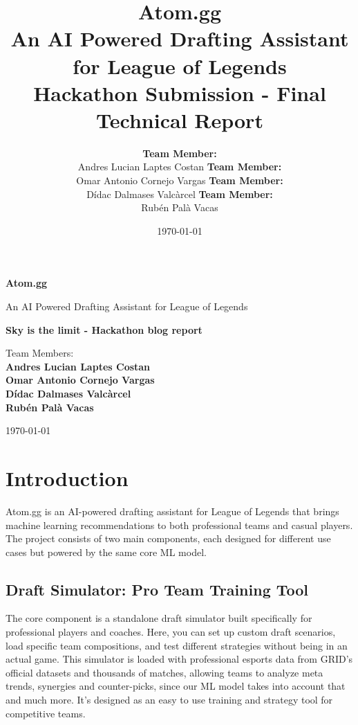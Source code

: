 \documentclass[12pt, a4paper]{article}
\title{
    \vspace{1cm}
    \textbf{\Huge Atom.gg} \\
    \vspace{0.5cm}
    \Large An AI Powered Drafting Assistant for League of Legends \\
    \vspace{1cm}
    \large Hackathon Submission - Final Technical Report
}
\author{
    \textbf{Team Member:} \\
    Andres Lucian Laptes Costan
    \textbf{Team Member:} \\
    Omar Antonio Cornejo Vargas
    \textbf{Team Member:} \\
    Dídac Dalmases Valcàrcel
    \textbf{Team Member:} \\
    Rubén Palà Vacas
}
\date{\today}
\begin{document}
    \begin{titlepage}
        \centering
        \vspace*{1cm}

        \Huge
        \textbf{Atom.gg}

        \vspace{0.5cm}
        \LARGE
        An AI Powered Drafting Assistant for League of Legends

        \vspace{1.5cm}

        \textbf{Sky is the limit - Hackathon blog report}

        \vspace{0.8cm}

        \Large
        Team Members:\\
        \textbf{Andres Lucian Laptes Costan} \\
        \textbf{Omar Antonio Cornejo Vargas}
        \\
        \textbf{Dídac Dalmases Valcàrcel}
        \\
        \textbf{Rubén Palà Vacas}
        \vfill

        \Large
        \today

        \vspace{1cm}
        \thispagestyle{empty}
    \end{titlepage}

    \newpage
    \tableofcontents

    \newpage
    \section*{Introduction}

    Atom.gg is an AI-powered drafting assistant for League of Legends that brings machine learning recommendations to both professional teams and casual players. The project consists of two main components, each designed for different use cases but powered by the same core ML model.

    \subsection*{Draft Simulator: Pro Team Training Tool}

    The core component is a standalone draft simulator built specifically for professional players and coaches. Here, you can set up custom draft scenarios, load specific team compositions, and test different strategies without being in an actual game. This simulator is loaded with professional esports data from GRID's official datasets and thousands of matches, allowing teams to analyze meta trends, synergies and counter-picks, since our ML model takes into account that and much more. It's designed as an easy to use training and strategy tool for competitive teams.
\end{document}
